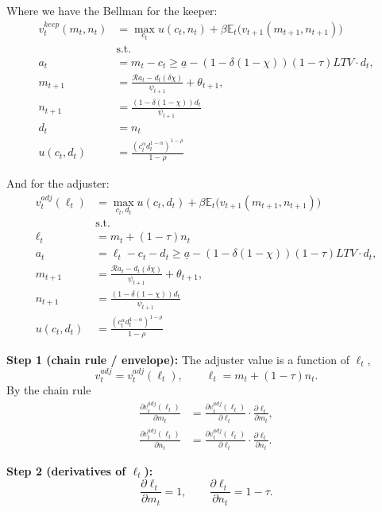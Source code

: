 \documentclass[\econtexMain]{subfiles}
\begin{document}
	Where we have the Bellman for the keeper:
	\begin{align}
		v_t^{keep}(m_t,n_t) &= \max_{c_t} u(c_t,n_t) + \beta \mathbb{E}_t \Big(v_{t+1}(m_{t+1}, n_{t+1})\Big)\\
		& \text{s.t.} \nonumber\\
		a_t &= m_t- c_t \geq \underline{a} - (1 - \delta(1 - \chi)) (1 - \tau) LTV \cdot d_t,\\
		m_{t+1} &= \frac{\mathcal{R} a_t - d_t (\delta \chi)}{\psi_{t+1}} + \theta_{t+1},\\
		n_{t+1} &= \frac{(1-\delta(1 - \chi))d_t}{\psi_{t+1}}\\
		d_t &= n_t \\
		u(c_t,d_t) &= \frac{(c_t^\alpha d_t^{1 - \alpha})^{1 - \rho}}{1 - \rho}
	\end{align}
	
	And for the adjuster:
	\begin{align}
		v_t^{adj}(\ell_t) &= \max_{c_t,d_t} u(c_t,d_t) + \beta \mathbb{E}_t \Big(v_{t+1}(m_{t+1}, n_{t+1})\Big)\\
		& \text{s.t.} \nonumber \\
		\ell_t &= m_t + (1 - \tau) n_t \\
		a_t &= \ell_t - c_t - d_t \geq \underline{a} - (1 - \delta(1 - \chi)) (1 - \tau) LTV \cdot d_t,\\
		m_{t+1} &= \frac{\mathcal{R} a_t - d_t (\delta \chi)}{\psi_{t+1}} + \theta_{t+1},\\
		n_{t+1} &= \frac{(1-\delta(1 - \chi))d_t}{\psi_{t+1}}\\
		u(c_t,d_t) &= \frac{(c_t^\alpha d_t^{1 - \alpha})^{1 - \rho}}{1 - \rho}
	\end{align}
	

\textbf{Step 1 (chain rule / envelope):} The adjuster value is a function of \(\ell_t\),
\[
v_t^{adj} = v_t^{adj}(\ell_t),\qquad \ell_t = m_t + (1-\tau)n_t.
\]
By the chain rule
\begin{align}
	\frac{\partial v_t^{adj}(\ell_t)}{\partial m_t}
	&= \frac{\partial v_t^{adj}(\ell_t)}{\partial \ell_t}\cdot\frac{\partial \ell_t}{\partial m_t}, \\
	\frac{\partial v_t^{adj}(\ell_t)}{\partial n_t}
	&= \frac{\partial v_t^{adj}(\ell_t)}{\partial \ell_t}\cdot\frac{\partial \ell_t}{\partial n_t}.
\end{align}

\textbf{Step 2 (derivatives of \(\ell_t\)):}
\[
\frac{\partial\ell_t}{\partial m_t} = 1, \qquad
\frac{\partial\ell_t}{\partial n_t} = 1-\tau.
\]
\end{document}
